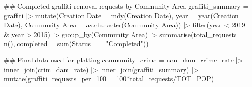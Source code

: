 \documentclass[
]{report}
\newenvironment{Shaded}{}{}
\newcommand{\AttributeTok}[1]{\textcolor[rgb]{0.84,0.23,0.29}{#1}}
\newcommand{\DecValTok}[1]{\textcolor[rgb]{0.00,0.36,0.77}{#1}}
\newcommand{\DocumentationTok}[1]{\textcolor[rgb]{0.42,0.45,0.49}{#1}}
\newcommand{\FunctionTok}[1]{\textcolor[rgb]{0.44,0.26,0.76}{#1}}
\newcommand{\NormalTok}[1]{\textcolor[rgb]{0.14,0.16,0.18}{#1}}
\newcommand{\OtherTok}[1]{\textcolor[rgb]{0.44,0.26,0.76}{#1}}
\newcommand{\SpecialCharTok}[1]{\textcolor[rgb]{0.00,0.36,0.77}{#1}}
\newcommand{\StringTok}[1]{\textcolor[rgb]{0.01,0.18,0.38}{#1}}
\begin{document}
\begin{Shaded}
\begin{Highlighting}[]
\DocumentationTok{\#\# Completed graffiti removal requests by Community Area}
\NormalTok{graffiti\_summary }\OtherTok{=}\NormalTok{ graffiti }\SpecialCharTok{|\textgreater{}} 
  \FunctionTok{mutate}\NormalTok{(}\StringTok{\textasciigrave{}}\AttributeTok{Creation Date}\StringTok{\textasciigrave{}} \OtherTok{=} \FunctionTok{mdy}\NormalTok{(}\StringTok{\textasciigrave{}}\AttributeTok{Creation Date}\StringTok{\textasciigrave{}}\NormalTok{),}
         \AttributeTok{year =} \FunctionTok{year}\NormalTok{(}\StringTok{\textasciigrave{}}\AttributeTok{Creation Date}\StringTok{\textasciigrave{}}\NormalTok{),}
         \StringTok{\textasciigrave{}}\AttributeTok{Community Area}\StringTok{\textasciigrave{}} \OtherTok{=} \FunctionTok{as.character}\NormalTok{(}\StringTok{\textasciigrave{}}\AttributeTok{Community Area}\StringTok{\textasciigrave{}}\NormalTok{)) }\SpecialCharTok{|\textgreater{}} 
  \FunctionTok{filter}\NormalTok{(year }\SpecialCharTok{\textless{}} \DecValTok{2019} \SpecialCharTok{\&}\NormalTok{ year }\SpecialCharTok{\textgreater{}} \DecValTok{2015}\NormalTok{) }\SpecialCharTok{|\textgreater{}} 
  \FunctionTok{group\_by}\NormalTok{(}\StringTok{\textasciigrave{}}\AttributeTok{Community Area}\StringTok{\textasciigrave{}}\NormalTok{) }\SpecialCharTok{|\textgreater{}} 
  \FunctionTok{summarise}\NormalTok{(}\AttributeTok{total\_requests =} \FunctionTok{n}\NormalTok{(),}
            \AttributeTok{completed =} \FunctionTok{sum}\NormalTok{(Status }\SpecialCharTok{==} \StringTok{"Completed"}\NormalTok{))}

\DocumentationTok{\#\# Final data used for plotting}
\NormalTok{community\_crime }\OtherTok{=}\NormalTok{ non\_dam\_crime\_rate }\SpecialCharTok{|\textgreater{}} 
  \FunctionTok{inner\_join}\NormalTok{(crim\_dam\_rate) }\SpecialCharTok{|\textgreater{}} 
  \FunctionTok{inner\_join}\NormalTok{(graffiti\_summary) }\SpecialCharTok{|\textgreater{}} 
  \FunctionTok{mutate}\NormalTok{(}\AttributeTok{graffiti\_requests\_per\_100 =} \DecValTok{100}\SpecialCharTok{*}\NormalTok{total\_requests}\SpecialCharTok{/}\NormalTok{TOT\_POP)}
\end{Highlighting}
\end{Shaded}
\end{document}
